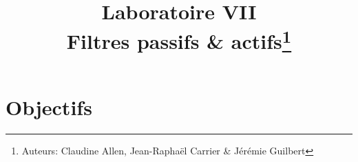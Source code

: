 \documentclass[canadien,12pt,oneside,letterpaper]{article}
\title{\textbf{Laboratoire VII}\\Filtres passifs \& actifs\thanks{Auteurs: Claudine Allen, Jean-Raphaël Carrier \& Jérémie Guilbert}}
\date{}
\begin{document}
\maketitle \vspace{-2cm}

\section{Objectifs}

%
%
%
%
\end{document}
